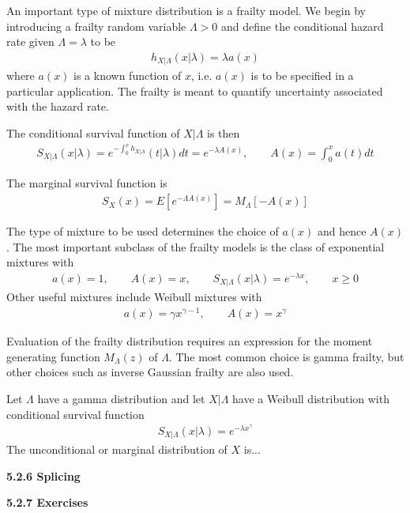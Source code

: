 \documentclass[hidelinks, 12pt]{article}
\theoremstyle{mydefstyle}
\theoremstyle{mythmstyle}
\begin{document}
An important type of mixture distribution is a frailty model. We begin by introducing a frailty random variable $\Lambda > 0$ and define the conditional hazard rate given $\Lambda = \lambda$ to be
\begin{gather*}
h_{X\vert\Lambda}(x\vert\lambda) = \lambda a(x)
\end{gather*}
where $a(x)$ is a known function of $x$, i.e. $a(x)$ is to be specified in a particular application. The frailty is meant to quantify uncertainty associated with the hazard rate. 

The conditional survival function of $X \vert \Lambda$ is then
\begin{gather*}
S_{X\vert\Lambda}(x\vert\lambda) = e^{-\int_0^x h_{X\vert\Lambda}}(t\vert\lambda) dt = e^{-\lambda A(x)}, \qquad A(x) = \int_0^x a(t) dt
\end{gather*}

The marginal survival function is
\begin{gather*}
S_X(x) = E[e^{-\Lambda A(x)}] = M_{\Lambda}[-A(x)] \tag{5.3}
\end{gather*}

The type of mixture to be used determines the choice of $a(x)$ and hence $A(x)$. The most important subclass of the frailty models is the class of exponential mixtures with
\begin{gather*}
a(x) = 1, \qquad A(x) = x, \qquad S_{X\vert\Lambda}(x\vert\lambda) = e^{-\lambda x}, \qquad x \ge 0
\end{gather*}
Other useful mixtures include Weibull mixtures with
\begin{gather*}
a(x) = \gamma x^{\gamma - 1}, \qquad A(x) = x^{\gamma}
\end{gather*}

Evaluation of the frailty distribution requires an expression for the moment generating function $M_{\Lambda}(z)$ of $\Lambda$. The most common choice is gamma frailty, but other choices such as inverse Gaussian frailty are also used.

Let $\Lambda$ have a gamma distribution and let $X\vert\Lambda$ have a Weibull distribution with conditional survival function
\begin{gather*}
S_{X\vert\Lambda}(x\vert\lambda) = e^{-\lambda x^{\gamma}}
\end{gather*}
The unconditional or marginal distribution of $X$ is...

\textbf{5.2.6 Splicing}

\textbf{5.2.7 Exercises}
\end{document}
